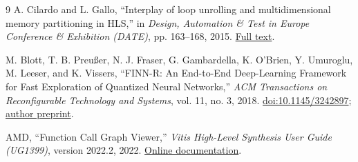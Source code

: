 \documentclass[11pt,letterpaper]{article}
\begin{document}
\begin{thebibliography}{9}
A. Cilardo and L. Gallo, ``Interplay of loop unrolling and multidimensional
memory partitioning in HLS,'' in \emph{Design, Automation \& Test in Europe
Conference \& Exhibition (DATE)}, pp. 163--168, 2015.
\href{https://past.date-conference.com/proceedings-archive/2015/pdf/0798.pdf}{Full text}.

M. Blott, T. B. Preu\ss er, N. J. Fraser, G. Gambardella, K. O'Brien,
Y. Umuroglu, M. Leeser, and K. Vissers,
``FINN-R: An End-to-End Deep-Learning Framework for Fast Exploration of
Quantized Neural Networks,'' \emph{ACM Transactions on Reconfigurable Technology
and Systems}, vol. 11, no. 3, 2018.
\href{https://doi.org/10.1145/3242897}{doi:10.1145/3242897};
\href{https://arxiv.org/abs/1809.04570}{author preprint}.

AMD, ``Function Call Graph Viewer,'' \emph{Vitis High-Level Synthesis User Guide
(UG1399)}, version 2022.2, 2022.
\href{https://docs.amd.com/r/2022.2-English/ug1399-vitis-hls/Function-Call-Graph-Viewer}{Online documentation}.
\end{thebibliography}
\end{document}
